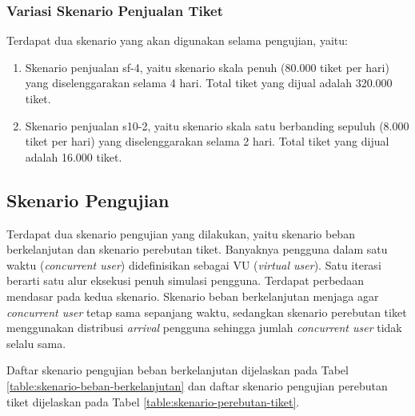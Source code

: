 \subsubsection{Variasi Skenario Penjualan Tiket}

Terdapat dua skenario yang akan digunakan selama pengujian, yaitu:

\begin{enumerate}
    \item Skenario penjualan sf-4, yaitu skenario skala penuh (80.000 tiket per hari) yang diselenggarakan selama 4 hari. Total tiket yang dijual adalah 320.000 tiket.
    \item Skenario penjualan s10-2, yaitu skenario skala satu berbanding sepuluh (8.000 tiket per hari) yang diselenggarakan selama 2 hari. Total tiket yang dijual adalah 16.000 tiket.
\end{enumerate}

\subsection{Skenario Pengujian}

Terdapat dua skenario pengujian yang dilakukan, yaitu skenario beban berkelanjutan dan skenario perebutan tiket. Banyaknya pengguna dalam satu waktu (\textit{concurrent user}) didefinisikan sebagai VU (\textit{virtual user}). Satu iterasi berarti satu alur eksekusi penuh simulasi pengguna. Terdapat perbedaan mendasar pada kedua skenario. Skenario beban berkelanjutan menjaga agar \textit{concurrent user} tetap sama sepanjang waktu, sedangkan skenario perebutan tiket menggunakan distribusi \textit{arrival} pengguna sehingga jumlah \textit{concurrent user} tidak selalu sama.

Daftar skenario pengujian beban berkelanjutan dijelaskan pada Tabel \ref{table:skenario-beban-berkelanjutan} dan daftar skenario pengujian perebutan tiket dijelaskan pada Tabel \ref{table:skenario-perebutan-tiket}.

